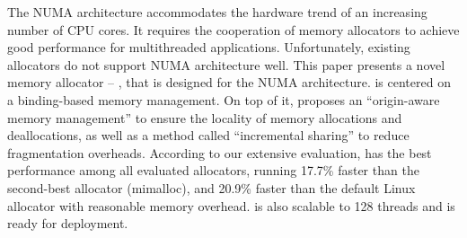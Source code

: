 The NUMA architecture accommodates the hardware trend of an increasing number of CPU cores. It requires the cooperation of memory allocators to achieve good performance for multithreaded applications. Unfortunately, existing allocators do not support NUMA architecture well.
This paper presents a novel memory allocator -- \NM{}, that is designed for the NUMA architecture. \NM{} is centered on a binding-based memory management. On top of it, \NM{} proposes an ``origin-aware memory management'' to ensure the locality of memory allocations and deallocations, as well as a method called ``incremental sharing'' to reduce fragmentation overheads.
According to our extensive evaluation, \NM{} has the best performance among all evaluated allocators, running 17.7\% faster than the second-best allocator (mimalloc), and 20.9\% faster than the default Linux allocator with reasonable memory overhead. 
\NM{} is also scalable to 128 threads and is ready for deployment.